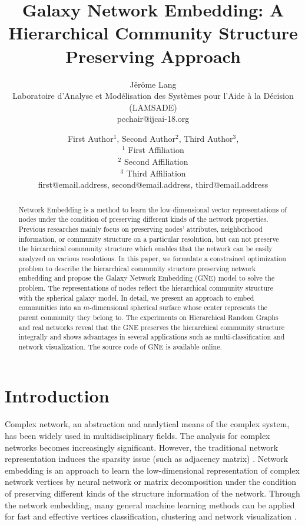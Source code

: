 \documentclass{article}
\title{Galaxy Network Embedding: A Hierarchical Community Structure Preserving Approach}
\author{Jêröme Lang\\ 
Laboratoire d'Analyse et Modélisation des Systèmes pour l'Aide à la Décision (LAMSADE)  \\
pcchair@ijcai-18.org}
\author{
First Author$^1$, 
Second Author$^2$, 
Third Author$^3$, 
\\ 
$^1$ First Affiliation \\
$^2$ Second Affiliation\\
$^3$ Third Affiliation  \\
%
first@email.address,
second@email.address,
third@email.address
}
\theoremstyle{definition}
\begin{document}
\maketitle

\begin{abstract}
	Network Embedding is a method to learn the low-dimensional vector representations of nodes under the condition of preserving different kinds of the network properties. Previous researches mainly focus on preserving nodes' attributes, neighborhood information, or community structure on a particular resolution, but can not preserve the hierarchical community structure which enables that the network can be easily analyzed on various resolutions. In this paper, we formulate a constrained optimization problem to describe the hierarchical community structure preserving network embedding and propose the Galaxy Network Embedding (GNE) model to solve the problem. The representations of nodes reflect the hierarchical community structure with the spherical galaxy model. In detail, we present an approach to embed communities into an $m$-dimensional spherical surface whose center represents the parent community they belong to. The experiments on Hierarchical Random Graphs and real networks reveal that the GNE preserves the hierarchical community structure integrally and shows advantages in several applications such as multi-classification and network visualization. The source code of GNE is available online.

\end{abstract}

\section{Introduction}

Complex network, an abstraction and analytical means of the complex system, has been widely used in multidisciplinary fields. 
		The analysis for complex networks becomes increasingly significant. However, the traditional network representation induces the sparsity issue (such as adjacency matrix) \cite{Perozzi2014DeepWalk}.
		Network embedding is an approach to learn the low-dimensional representation of complex network vertices by neural network \cite{Grover2016node2vec} or matrix decomposition \cite{Wang2017Community} under the condition of preserving different kinds of the structure information of the network. Through the network embedding, many general machine learning methods can be applied for fast and effective vertices classification, clustering and network visualization \cite{bhagat2011node} \cite{yan2007graph}.
		
\end{document}
